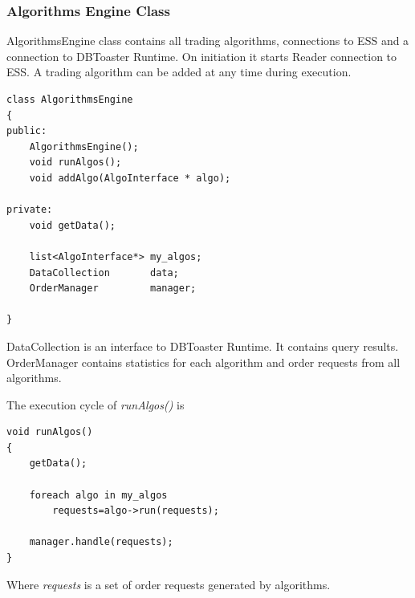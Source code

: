 \documentclass[14pt]{article}
\newcommand{\comment}[1]{}
\begin{document}
\comment{
Algorithm Engine code developed by the end users. The code makes use of
DBToaster Runtime to query the continuous data from input streams specified by
the users. The query results are then processed by user defined algorithms to
achieve their goals.
}

\comment{
In our example Algorithmic Engine creates and runs a set of monitoring queries
for the stock trading depending on the results of the queries and the internal
mechanics - algorithms decide to buy or sell stocks on a NASDAQ Trading Exchange
Simulator.
}

\subsubsection{Algorithms Engine Class}

AlgorithmsEngine class contains all trading algorithms, connections to ESS and a
connection to DBToaster Runtime. On initiation it starts Reader connection to
ESS. A trading algorithm can be added at any time during execution.

\begin{Verbatim}
class AlgorithmsEngine
{
public:
    AlgorithmsEngine();
    void runAlgos();
    void addAlgo(AlgoInterface * algo);

private:
    void getData();
    
    list<AlgoInterface*> my_algos;
    DataCollection       data;
    OrderManager         manager;
	
}
\end{Verbatim}

DataCollection is an interface to DBToaster Runtime. It contains query
results. OrderManager contains statistics for each algorithm and order requests
from all algorithms.

The execution cycle of \emph{runAlgos()} is

\begin{Verbatim}
void runAlgos()
{
    getData();
    
    foreach algo in my_algos
        requests=algo->run(requests);
    
    manager.handle(requests);
}
\end{Verbatim}

Where \emph{requests} is a set of order requests generated by algorithms.

\comment{
Algorithmic Engine interacts with environment in three different ways. First of
all the Engine needs to receive the information from from DBToaster
runtime. This interaction is unavoidable since the Engine needs the results of
the queries. Another interaction which needs to be added is the way to specify
the information stream received by a DBToaster runtime. This information needs
to be passed the the Runtime in the form of c++ code for the Runtime to
compile. Another optional source of interaction is infulencing the
enviroment. In our example is the Engine's capability to add/remove stock
requests from the Exchange Server.
}
\end{document}
